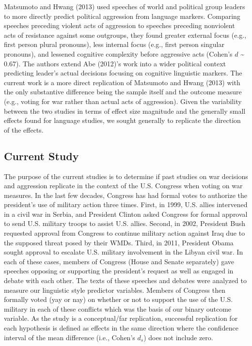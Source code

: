 \documentclass[english,,man]{apa6}
\begin{document}
Matsumoto and Hwang (2013) used speeches of world and political group leaders to more directly predict political aggression from language markers. Comparing speeches preceding violent acts of aggression to speeches preceding nonviolent acts of resistance against some outgroups, they found greater external focus (e.g., first person plural pronouns), less internal focus (e.g., first person singular pronouns), and lessened cognitive complexity before aggressive acts (Cohen's \(d\) \textasciitilde{} 0.67). The authors extend Abe (2012)'s work into a wider political context predicting leader's actual decisions focusing on cognitive linguistic markers. The current work is a more direct replication of Matsumoto and Hwang (2013) with the only substantive difference being the sample itself and the outcome measure (e.g., voting for war rather than actual acts of aggression). Given the variability between the two studies in terms of effect size magnitude and the generally small effects found for language studies, we sought generally to replicate the direction of the effects.

\hypertarget{current-study}{%
\subsection{Current Study}\label{current-study}}

The purpose of the current studies is to determine if past studies on war decisions and aggression replicate in the context of the U.S. Congress when voting on war measures. In the last few decades, Congress has had formal votes to authorize the president's use of military action three times. First, in 1999, U.S. allies intervened in a civil war in Serbia, and President Clinton asked Congress for formal approval to send U.S. military troops to assist U.S. allies. Second, in 2002, President Bush requested approval from Congress to continue military action against Iraq due to the supposed threat posed by their WMDs. Third, in 2011, President Obama sought approval to escalate U.S. military involvement in the Libyan civil war. In each of these cases, members of Congress (House and Senate separately) gave speeches opposing or supporting the president's request as well as engaged in debate with each other. The texts of these speeches and debates were analyzed to measure our linguistic style predictor variables. Members of Congress then formally voted (yay or nay) on whether or not to support the use of the U.S. military in each of these conflicts which was the basis of our binary outcome variable. As the study is a conceptual/far replication, successful replication for each hypothesis is defined as effects in the same direction where the confidence interval of the mean difference (i.e., Cohen's \(d_s\)) does not include zero.
\end{document}

